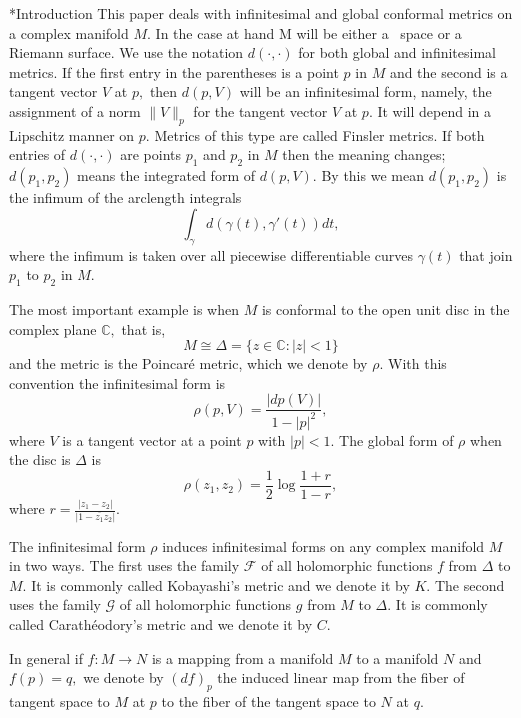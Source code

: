 \documentclass[12pt]{amsart}
\theoremstyle{remark}
\newcommand{\Car}{Carath\'eodory}
\theoremstyle{definition}
\theoremstyle{definition}
\begin{document}
\begin{section}*{Introduction}  
This paper deals with infinitesimal and global conformal metrics on a complex manifold $M.$ In the case at hand M will be either a \te\ space or a Riemann surface.  We use the notation $d(\cdot,\cdot)$  for both global and infinitesimal metrics. If the first entry in the parentheses is a point  $p$ in $M$ and the second  is a tangent vector $V$ at $p,$ then $d(p,V)$ will be an infinitesimal form,  namely, the assignment of a  norm $\|V\|_p$  for the tangent vector  $V$ at $p.$  It will depend in a Lipschitz manner on $p.$  Metrics of this type are called Finsler metrics.  If both entries of $d(\cdot,\cdot)$ are points $p_1$ and $p_2$ in $M$ then the meaning changes;  
$d(p_1,p_2)$ means the integrated form of $d(p,V).$  By this we mean 
$d(p_1, p_2)$ is the infimum of the arclength integrals
\begin{equation}\label{def100}
\int_{\gamma} d(\gamma(t), \gamma'(t)) dt,
\end{equation}
where the infimum is taken over all piecewise differentiable curves $\gamma(t)$ that join $p_1$ to $p_2$ in $M.$

The most important example is when $M$ is conformal to the open unit disc in the complex plane ${\mathbb C},$ that is, 
$$M \cong \Delta= \{z \in {\mathbb C}: |z|<1\}$$ and the metric is the Poincar\'e metric, which we denote by $\rho.$ 
With this convention the infinitesimal form is 
\begin{equation}\label{200}\rho(p,V)=\frac{|dp(V)|}{1-|p|^2},\end{equation}
where $V$ is a tangent vector at a point $p$ with $|p|<1.$  The 
global form of $\rho$ when the disc is $\Delta$ is 
\begin{equation}\label{one}\rho(z_1,z_2)=\frac{1}{2} \log \frac{1+r}{1-r},
\end{equation}
where $r=\frac{|z_1-z_2|}{|1-\overline{z_1}z_2|}.$ 


The infinitesimal form $\rho$  induces  infinitesimal forms on any 
complex manifold $M$ in two ways.  The first uses  the family $\mathcal{F}$ of all holomorphic functions  $f$ from $\Delta$ to $M.$  It is commonly called Kobayashi's metric and we denote it by 
$K.$ The second uses  the family $\mathcal{G}$ of all holomorphic functions $g$ from $M$ to $\Delta.$  It is commonly called  \Car's metric and we denote it by $C.$    

    In general if $f:M \rightarrow N$ is a mapping from a manifold $M$ to a manifold $N$ and $f(p)=q,$
    we denote by $(df)_p$ the induced linear map from the fiber of  tangent space to $M$ at $p$ to the fiber of the tangent space to $N$ at $q.$ 


\end{section}
\end{document}
